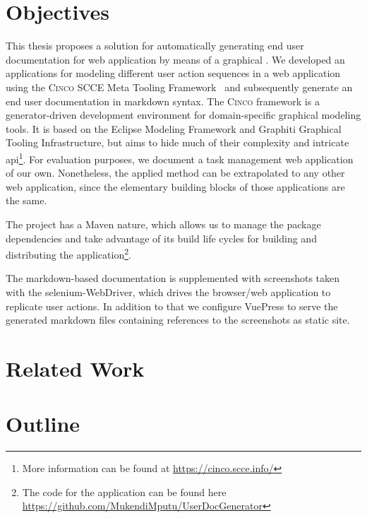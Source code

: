 \section{Objectives}\label{sec:objectives}

This thesis proposes a solution for automatically generating end user documentation for web application by means of a graphical . We developed an applications for modeling different user action sequences in a web application using the \textsc{Cinco} SCCE Meta Tooling Framework~\cite{Cinco} and subsequently generate an end user documentation in markdown syntax. The \textsc{Cinco} framework is a generator-driven development environment for domain-specific graphical modeling tools. It is based on the Eclipse Modeling Framework and Graphiti Graphical Tooling Infrastructure, but aims to hide much of their complexity and intricate \gls{api}\footnote{More information can be found at \url{https://cinco.scce.info/}}. For evaluation purposes, we document a task management web application of our own. Nonetheless, the applied method can be extrapolated to any other web application, since the elementary building blocks of those applications are the same.

The project has a Maven nature, which allows us to manage the package dependencies and take advantage of its build life cycles for building and distributing the application\footnote{The code for the application can be found here \url{https://github.com/MukendiMputu/UserDocGenerator}}.

The markdown-based documentation is supplemented with screenshots taken with the \gls{selenium}-WebDriver, which drives the browser/web application to replicate user actions. In addition to that we configure \gls{VuePress} to serve the generated markdown files containing references to the screenshots as static site.

\section{Related Work}\label{sec:relWork}



\section{Outline}\label{sec:outline}


